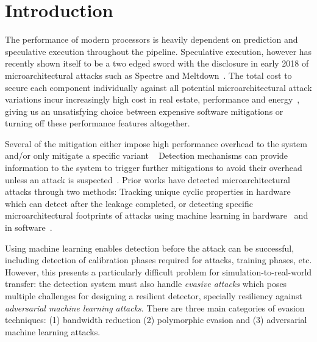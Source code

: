 \section{Introduction} 

The performance of modern processors is heavily dependent on prediction and speculative execution throughout the pipeline.  Speculative execution, however has recently shown itself to be a two edged sword with the disclosure in early 2018 of microarchitectural attacks such as Spectre and Meltdown~\cite{spectre, meltdown}. The total cost to secure each component individually against all potential microarchitectural attack variations incur increasingly high cost in real estate, performance and energy~\cite{canella2018systematic, schwarz2019zombieload}, giving us an unsatisfying choice between expensive software mitigations or turning off these performance features altogether.  

 
Several of the mitigation either impose high performance overhead
to the system and/or only mitigate a specific variant
~\cite{taram_csf19, intelanalysis, kiriansky2018dawg, domnitser2012non,saileshwar2019cleanupspec,retpoline, wang2007new, yu2019speculative, yan2018invisispec,CEASER,amd, koruyeh2019speccfi, arm_css}
Detection mechanisms can provide information to the system to trigger further
mitigations to avoid their overhead unless an attack is suspected~\cite{gulmezoglu2019fortuneteller, PerSpectron, cyclone2019}.
Prior works have detected microarchitectural attacks through two methods: Tracking unique cyclic properties in hardware ~\cite{cyclone2019} which can detect after the leakage completed, or detecting specific microarchitectural footprints of attacks using machine learning in hardware~\cite{PerSpectron, RHMD2017} and in software~\cite{gulmezoglu2019fortuneteller, cacheBasedDetection2016Chiappetta,
CloudRadar2016,
BlackHatFogh,
payer2016hexpads,
ICCAD2015Wang,
Duppel2013Zhang, 
mushtaq:cel-01824512}. 

Using machine learning enables detection before the attack can be successful, including detection of calibration phases required for attacks, training phases, etc. 
However, this presents a particularly difficult
problem for simulation-to-real-world transfer: %
the detection
system must also handle {\em evasive attacks} which poses multiple challenges for designing a resilient detector, specially resiliency against {\em adversarial machine learning attacks}. There are three main categories of evasion techniques: (1) bandwidth reduction (2) polymorphic evasion and (3) adversarial machine learning attacks.   


